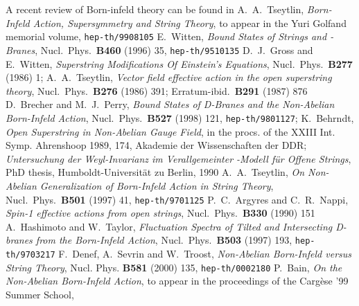 \documentclass[12pt,a4paper]{article}
\begin{document}
\begin{thebibliography}{99}
   A recent review of Born-infeld theory can be found in
               A.~A.~Tseytlin,
               {\it Born-Infeld Action,  Supersymmetry and String
               Theory},
               to appear in the Yuri Golfand memorial volume,
               {\tt hep-th/9908105}
  E.~Witten,
               {\it Bound States of Strings and \coordHE{}-Branes},
               Nucl.~Phys.~{\bf B460} (1996) 35,
               {\tt hep-th/9510135}
   D.~J.~Gross and E.~Witten,
               {\it Superstring Modifications Of Einstein's Equations},
               Nucl.~Phys.~{\bf B277} (1986) 1;
               A.~A.~Tseytlin, 
               {\it Vector field effective action in the open 
               superstring theory},
               Nucl.~Phys.~{\bf B276} (1986) 391; Erratum-ibid.~{\bf B291}
               (1987) 876 
   D.~Brecher and M.~J.~Perry,
               {\it Bound States of D-Branes and the Non-Abelian
                 Born-Infeld Action},
               Nucl.~Phys.~{\bf B527} (1998) 121,
               {\tt hep-th/9801127};
               K.~Behrndt,
               {\it Open Superstring in Non-Abelian Gauge Field},
               in the procs. of the XXIII Int. Symp. Ahrenshoop 1989,
               174, Akademie der Wissenschaften der DDR;
               {\it Untersuchung der
               Weyl-Invarianz im Verallgemeinter \myHighlight{$\sigma$}\coordHE{}-Modell f\"ur Offene
               Strings}, PhD thesis, Humboldt-Universit\"at zu Berlin, 1990
  A.~A.~Tseytlin,
               {\it On Non-Abelian Generalization of Born-Infeld
                 Action in String Theory},
               Nucl.~Phys.~{\bf B501} (1997) 41,
               {\tt hep-th/9701125}
   P.~C.~Argyres and C.~R.~Nappi,
               {\it Spin-1 effective actions from open strings},
               Nucl.~Phys.~{\bf B330} (1990) 151
   A.~Hashimoto and W.~Taylor,
               {\it Fluctuation Spectra of Tilted and Intersecting D-branes
                  from the Born-Infeld Action},
               Nucl.~Phys.~{\bf B503} (1997) 193,
               {\tt hep-th/9703217}
  F.~Denef, A.~Sevrin and W.~Troost,
               {\it Non-Abelian Born-Infeld versus String Theory},
               Nucl. Phys. {\bf B581} (2000) 135,
               {\tt hep-th/0002180}
    P.~Bain,
               {\it On the Non-Abelian Born-Infeld Action},
               to
               appear in the proceedings of the Carg\`ese '99 Summer School,

\end{thebibliography}
\end{document}
